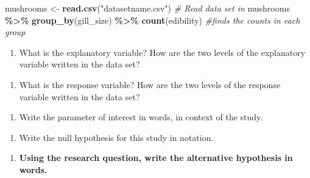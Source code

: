 \documentclass[
]{report}
\newenvironment{Shaded}{\begin{snugshade}}{\end{snugshade}}
\newcommand{\CommentTok}[1]{\textcolor[rgb]{0.56,0.35,0.01}{\textit{#1}}}
\newcommand{\FunctionTok}[1]{\textcolor[rgb]{0.13,0.29,0.53}{\textbf{#1}}}
\newcommand{\NormalTok}[1]{#1}
\newcommand{\OtherTok}[1]{\textcolor[rgb]{0.56,0.35,0.01}{#1}}
\newcommand{\SpecialCharTok}[1]{\textcolor[rgb]{0.81,0.36,0.00}{\textbf{#1}}}
\newcommand{\StringTok}[1]{\textcolor[rgb]{0.31,0.60,0.02}{#1}}
\providecommand{\tightlist}{%
  \setlength{\itemsep}{0pt}\setlength{\parskip}{0pt}}
\begin{document}
\begin{Shaded}
\begin{Highlighting}[]
\NormalTok{mushrooms }\OtherTok{\textless{}{-}} \FunctionTok{read.csv}\NormalTok{(}\StringTok{"datasetname.csv"}\NormalTok{) }\CommentTok{\# Read data set in}
\NormalTok{mushrooms }\SpecialCharTok{\%\textgreater{}\%} \FunctionTok{group\_by}\NormalTok{(gill\_size) }\SpecialCharTok{\%\textgreater{}\%} \FunctionTok{count}\NormalTok{(edibility) }\CommentTok{\#finds the counts in each group}
\end{Highlighting}
\end{Shaded}

\begin{enumerate}
\def\labelenumi{\arabic{enumi}.}
\tightlist
\item
  What is the explanatory variable? How are the two levels of the explanatory variable written in the data set?
\end{enumerate}

\vspace{0.5in}

\begin{enumerate}
\def\labelenumi{\arabic{enumi}.}
\setcounter{enumi}{1}
\tightlist
\item
  What is the response variable? How are the two levels of the response variable written in the data set?
\end{enumerate}

\vspace{0.5in}

\begin{enumerate}
\def\labelenumi{\arabic{enumi}.}
\setcounter{enumi}{2}
\tightlist
\item
  Write the parameter of interest in words, in context of the study.
\end{enumerate}

\vspace{1in}

\begin{enumerate}
\def\labelenumi{\arabic{enumi}.}
\setcounter{enumi}{3}
\tightlist
\item
  Write the null hypothesis for this study in notation.
\end{enumerate}

\vspace{0.25in}

\newpage

\begin{enumerate}
\def\labelenumi{\arabic{enumi}.}
\setcounter{enumi}{4}
\tightlist
\item
  \textbf{Using the research question, write the alternative hypothesis in words.}
\end{enumerate}
\end{document}
